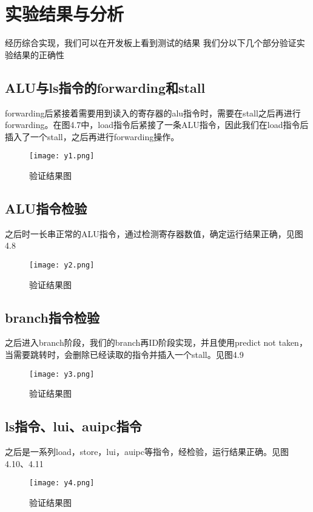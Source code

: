 \section{实验结果与分析}
经历综合实现，我们可以在开发板上看到测试的结果
我们分以下几个部分验证实验结果的正确性
\subsection{ALU与ls指令的forwarding和stall}
forwarding后紧接着需要用到读入的寄存器的alu指令时，需要在stall之后再进行forwarding。在图4.7中，load指令后紧接了一条ALU指令，因此我们在load指令后插入了一个stall，之后再进行forwarding操作。
\begin{figure}
	\centering %
	\texttt{[image: y1.png]} %
	\caption{验证结果图} %
	\label{Fig.7} %
\end{figure}
\subsection{ALU指令检验}
之后时一长串正常的ALU指令，通过检测寄存器数值，确定运行结果正确，见图4.8
\begin{figure}
	\centering %
	\texttt{[image: y2.png]} %
	\caption{验证结果图} %
	\label{Fig.8} %
\end{figure}
\subsection{branch指令检验}
之后进入branch阶段，我们的branch再ID阶段实现，并且使用predict not taken，当需要跳转时，会删除已经读取的指令并插入一个stall。见图4.9
\begin{figure}
	\centering %
	\texttt{[image: y3.png]} %
	\caption{验证结果图} %
	\label{Fig.9} %
\end{figure}
\subsection{ls指令、lui、auipc指令}
之后是一系列load，store，lui，auipc等指令，经检验，运行结果正确。见图4.10、4.11
\begin{figure}
	\centering %
	\texttt{[image: y4.png]} %
	\caption{验证结果图} %
	\label{Fig.10} %
\end{figure}

